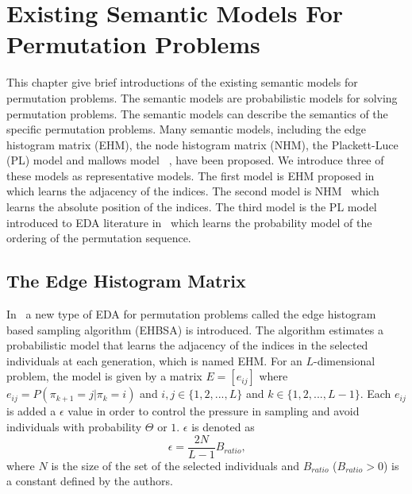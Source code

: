 \section{Existing Semantic Models For Permutation Problems }
\label{ch:related_works}

This chapter give brief introductions of the existing semantic models for permutation problems. The semantic models are probabilistic models for solving permutation problems.  The semantic models can describe the semantics of the specific permutation problems. Many semantic models, including the edge histogram matrix (EHM), the node histogram matrix (NHM), the Plackett-Luce (PL) model and mallows model  ~\citep{ceberio2012review, bosman2001crossing, tsutsui2002probabilistic, tsutsui2006node, ceberio2011introducing, ceberio2013plackett, pelikan2007dependency}, have been proposed. We introduce three of these models as representative models. The first model is EHM proposed in~\citep{tsutsui2002probabilistic} which learns the adjacency of the indices. The second model is NHM~\citep{tsutsui2006node} which learns the absolute position of the indices. The third model is the PL model introduced to EDA literature in~\citep{ceberio2013plackett} which learns the probability model of the ordering of the permutation sequence.


\subsection{The Edge Histogram Matrix}
In~\citep{tsutsui2002probabilistic} a new type of EDA for permutation problems called the edge histogram based sampling algorithm (EHBSA) is introduced. The algorithm estimates a probabilistic model that learns the adjacency of the indices in the selected individuals at each generation, which is named EHM. For an $L$-dimensional problem, the model is given by a matrix $E=[e_{ij}]$ where $e_{ij} = P(\pi_{k+1}=j|\pi_k=i)$ and $i, j \in \{1,2,...,L\}$ and $k \in \{1,2,...,L-1\}$. Each $e_{ij}$ is added a $\epsilon$ value in order to control the pressure in sampling and avoid individuals with probability $\Theta$ or $1$. $\epsilon$ is denoted as
\begin{equation*}
    \epsilon = \frac{2N}{L-1}B_{ratio} \text{,}
\end{equation*}
where $N$ is the size of the set of the selected individuals and $B_{ratio}$ ($B_{ratio} >
0$) is a constant defined by the authors.



